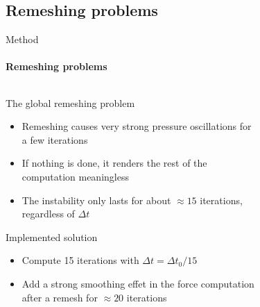 \documentclass[aspectratio=169]{beamer}
\begin{document}

\subsection{Remeshing problems}
\begin{frame}{Method}
    \framesubtitle{Remeshing problems}
    \begin{columns}
        \begin{column}{.79\textwidth}
            The global remeshing problem
            \begin{itemize}
                \item Remeshing causes very strong pressure oscillations for a few iterations
                \item If nothing is done, it renders the rest of the computation meaningless
                \item The instability only lasts for about $\approx 15$ iterations, regardless of $\Delta t$
            \end{itemize}
            \vspace{0.2cm}
            Implemented solution
            \begin{itemize}
                \item Compute 15 iterations with $\Delta t = \Delta t_0/15$
                \item Add a strong smoothing effet in the force computation after a remesh for $\approx 20$ iterations
            \end{itemize}
    
    
        \end{column}
        
        \begin{column}{.1\textwidth}
            \begin{figure}
                \centering
            \end{figure}
        \end{column}
        \begin{column}{.1\textwidth}
            \begin{figure}
                \centering
            \end{figure}
        \end{column}
    \end{columns}
    
\end{frame}
\end{document}
